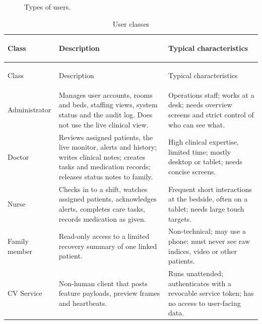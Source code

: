 \documentclass[a4paper,11pt]{scrreprt}
\begin{document}
\begin{figure}[h!]
\centering
{}
\caption{Types of users.}
\label{fig:users}
\end{figure}

\begin{longtable}{@{}>{\bfseries\raggedright\arraybackslash}p{2.6cm}>{\raggedright\arraybackslash}p{6.6cm}>{\raggedright\arraybackslash}p{5.8cm}@{}}
\caption{User classes}\\
\toprule Class & Description & Typical characteristics\\ \midrule \endfirsthead
\toprule Class & Description & Typical characteristics\\ \midrule \endhead
\bottomrule \endfoot
Administrator & Manages user accounts, rooms and beds, staffing views, system status and the audit log. Does not use the live clinical view. & Operations staff; works at a desk; needs overview screens and strict control of who can see what.\\ \midrule
Doctor & Reviews assigned patients, the live monitor, alerts and history; writes clinical notes; creates tasks and medication records; releases status notes to family. & High clinical expertise, limited time; mostly desktop or tablet; needs concise screens.\\ \midrule
Nurse & Checks in to a shift, watches assigned patients, acknowledges alerts, completes care tasks, records medication as given. & Frequent short interactions at the bedside, often on a tablet; needs large touch targets.\\ \midrule
Family member & Read-only access to a limited recovery summary of one linked patient. & Non-technical; may use a phone; must never see raw indices, video or other patients.\\ \midrule
CV Service & Non-human client that posts feature payloads, preview frames and heartbeats. & Runs unattended; authenticates with a revocable service token; has no access to user-facing data.\\
\end{longtable}
\end{document}
